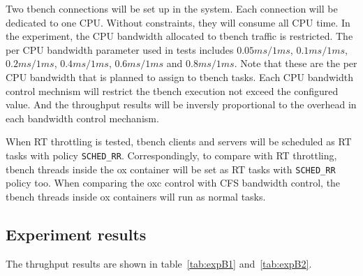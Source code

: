 Two tbench connections will be set up in the system.
Each connection will be dedicated to one CPU.
Without constraints, they will consume all CPU time.
In the experiment, the CPU bandwidth allocated to tbench traffic is restricted.
The per CPU bandwidth parameter used in tests includes
$0.05ms/1ms$, $0.1ms/1ms$, $0.2ms/1ms$, $0.4ms/1ms$, $0.6ms/1ms$ and 
$0.8ms/1ms$. 
Note that these are the per CPU bandwidth that is planned to assign to 
tbench tasks. Each CPU bandwidth control mechnism will restrict the 
tbench execution not exceed the configured value. And the throughput 
results will be inversly proportional to the overhead in each bandwidth 
control mechanism.

When RT throttling is tested, tbench clients and servers will be 
scheduled as RT tasks with policy \texttt{SCHED\_RR}. 
Correspondingly, to 
compare with RT throttling, tbench threads inside the ox container will 
be set as RT tasks with \texttt{SCHED\_RR} policy too. 
When comparing the oxc control with CFS bandwidth control, the tbench
threads inside ox containers will run as normal tasks. 

\subsection{Experiment results}

The thrughput results are shown in table~\ref{tab:expB1} and~\ref{tab:expB2}.

